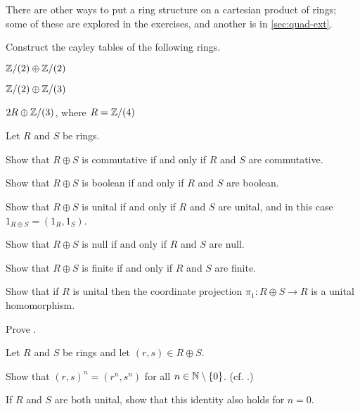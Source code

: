There are other ways to put a ring structure on a cartesian product of rings; some of these are explored in the exercises, and another is in \autoref{sec:quad-ext}.



\Exercises%

\begin{exercise}
Construct the cayley tables of the following rings.
\begin{proplist*}
\item \(\mathbb{Z}/(2) \oplus \mathbb{Z}/(2)\)
\item \(\mathbb{Z}/(2) \oplus \mathbb{Z}/(3)\)
\item \(2R \oplus \mathbb{Z}/(3)\), where \(R = \mathbb{Z}/(4)\)
\end{proplist*}
\end{exercise}


\begin{exercise}
Let \(R\) and \(S\) be rings.
\begin{proplist*}
\item Show that \(R \oplus S\) is commutative if and only if \(R\) and \(S\) are commutative.
\item Show that \(R \oplus S\) is boolean if and only if \(R\) and \(S\) are boolean.
\item Show that \(R \oplus S\) is unital if and only if \(R\) and \(S\) are unital, and in this case \(1_{R \oplus S} = (1_R, 1_S)\).
\item Show that \(R \oplus S\) is null if and only if \(R\) and \(S\) are null.
\item Show that \(R \oplus S\) is finite if and only if \(R\) and \(S\) are finite.
\end{proplist*}
\end{exercise}


\begin{exercise}
Show that if \(R\) is unital then the coordinate projection \(\pi_1 : R \oplus S \rightarrow R\) is a unital homomorphism.
\end{exercise}


\begin{exercise}
Prove .
\end{exercise}

\begin{exercise}
Let \(R\) and \(S\) be rings and let \((r,s) \in R \oplus S\).
\begin{proplist}
\item Show that \((r,s)^n = (r^n, s^n)\) for all \(n \in \mathbb{N} \setminus \{0\}\).
(cf. .)
\item If \(R\) and \(S\) are both unital, show that this identity also holds for \(n = 0\).
\end{proplist}
\end{exercise}


